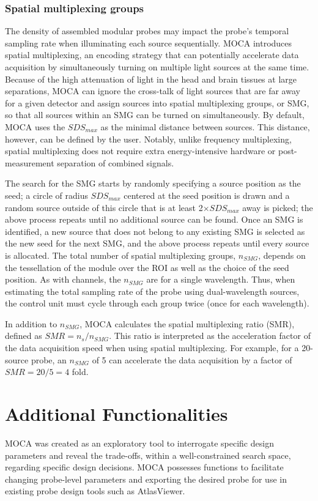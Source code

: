 \subsubsection{Spatial multiplexing groups}
The density of assembled modular probes may impact the probe's temporal sampling rate when illuminating each source sequentially. \ac{MOCA} introduces spatial multiplexing, an encoding strategy that can potentially accelerate data acquisition by simultaneously turning on multiple light sources at the same time. Because of the high attenuation of light in the head and brain tissues at large separations, \ac{MOCA} can ignore the cross-talk of light sources that are far away for a given detector and assign sources into spatial multiplexing groups, or SMG, so that all sources within an SMG can be turned on simultaneously. By default, \ac{MOCA} uses the $SDS_{max}$ as the minimal distance between sources. This distance, however, can be defined by the user. Notably, unlike frequency multiplexing, spatial multiplexing does not require extra energy-intensive hardware or post-measurement separation of combined signals. 

The search for the SMG starts by randomly specifying a source position as the seed; a circle of radius $SDS_{max}$ centered at the seed position is drawn and a random source outside of this circle that is at least 2$\times SDS_{max}$ away is picked; the above process repeats until no additional source can be found. Once an SMG is identified, a new source that does not belong to any existing SMG is selected as the new seed for the next SMG, and the above process repeats until every source is allocated. The total number of spatial multiplexing groups, $n_{SMG}$, depends on the tessellation of the module over the \ac{ROI} as well as the choice of the seed position. As with channels, the $n_{SMG}$ are for a single wavelength. Thus, when estimating the total sampling rate of the probe using dual-wavelength sources, the control unit must cycle through each group twice (once for each wavelength).

In addition to $n_{SMG}$, \ac{MOCA} calculates the spatial multiplexing ratio (SMR), defined as $SMR=n_s/n_{SMG}$. This ratio is interpreted as the acceleration factor of the data acquisition speed when using spatial multiplexing. For example, for a 20-source probe, an $n_{SMG}$ of 5 can accelerate the data acquisition by a factor of $SMR=20/5=4$ fold.



\section{Additional Functionalities}
\label{sec:features}
\ac{MOCA} was created as an exploratory tool to interrogate specific design parameters and reveal the trade-offs, within a well-constrained search space, regarding specific design decisions. \ac{MOCA} possesses functions to facilitate changing probe-level parameters and exporting the desired probe for use in existing probe design tools such as AtlasViewer.


